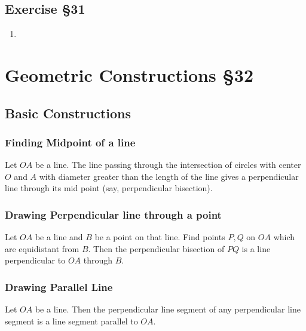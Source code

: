 \subsection{Exercise \S31}
\begin{enumerate}
	\item
\end{enumerate}

\section{Geometric Constructions \S32}
\subsection{Basic Constructions}
\subsubsection{Finding Midpoint of a line}
	Let $OA$ be a line.
	The line passing through the intersection of circles with center $O$ and $A$ with diameter greater than the length of the line gives a perpendicular line through its mid point (say, perpendicular bisection).

\subsubsection{Drawing Perpendicular line through a point}
	Let $OA$ be a line and $B$ be a point on that line.
	Find points $P,Q$ on $OA$ which are equidistant from $B$.
	Then the perpendicular bisection of $PQ$ is a line perpendicular to $OA$ through $B$.
\subsubsection{Drawing Parallel Line} 
	Let $OA$ be a line.
	Then the perpendicular line segment of any perpendicular line segment is a line segment parallel to $OA$.
